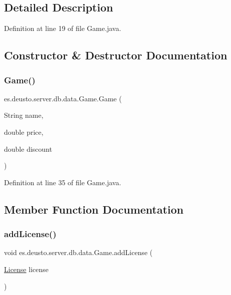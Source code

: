 \subsection{Detailed Description}


Definition at line 19 of file Game.\+java.



\subsection{Constructor \& Destructor Documentation}
\mbox{\label{classes_1_1deusto_1_1server_1_1db_1_1data_1_1_game_aad926d06e556453f4b08efa5a3e620d4}} 
\subsubsection{\texorpdfstring{Game()}{Game()}}
{\footnotesize\ttfamily es.\+deusto.\+server.\+db.\+data.\+Game.\+Game (\begin{DoxyParamCaption}\item[{String}]{name,  }\item[{double}]{price,  }\item[{double}]{discount }\end{DoxyParamCaption})}



Definition at line 35 of file Game.\+java.



\subsection{Member Function Documentation}
\mbox{\label{classes_1_1deusto_1_1server_1_1db_1_1data_1_1_game_aaa7e3ebbc4cd3b62080b39c98d374424}} 
\subsubsection{\texorpdfstring{add\+License()}{addLicense()}}
{\footnotesize\ttfamily void es.\+deusto.\+server.\+db.\+data.\+Game.\+add\+License (\begin{DoxyParamCaption}\item[{\hyperlink{classes_1_1deusto_1_1server_1_1db_1_1data_1_1_license}{License}}]{license }\end{DoxyParamCaption})}



